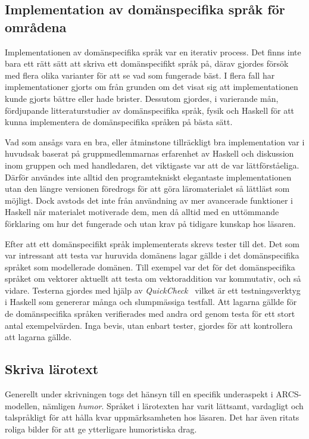 \subsection{Implementation av domänspecifika språk för områdena}

Implementationen av domänspecifika språk var en iterativ process.  Det finns inte bara
ett rätt sätt att skriva ett domänspecifikt språk på, därav gjordes försök med
flera olika varianter för att se vad som fungerade bäst. I flera fall har implementationer gjorts om från grunden om
det visat sig att implementationen kunde gjorts bättre eller
hade brister. Dessutom gjordes, i varierande mån, fördjupande litteraturstudier av domänspecifika
språk, fysik och Haskell för att kunna implementera de domänspecifika språken på bästa sätt.

Vad som ansågs vara en bra, eller åtminstone tillräckligt bra implementation
var i huvudsak baserat på gruppmedlemmarnas erfarenhet av Haskell och diskussion
inom gruppen och med handledaren, det viktigaste var att de var
lättförståeliga. Därför användes inte alltid den programtekniskt elegantaste
implementationen utan den längre versionen föredrogs för att göra
läromaterialet så lättläst som möjligt. Dock avstods det inte från användning av
mer avancerade funktioner i Haskell när materialet motiverade dem, men då alltid
med en uttömmande förklaring om hur det fungerade och utan krav på tidigare
kunskap hos läsaren.

Efter att ett domänspecifikt språk implementerats skrevs tester till det. Det
som var intressant att testa var huruvida domänens lagar gällde i det domänspecifika språket som modellerade domänen. Till exempel var det för det domänspecifika språket om vektorer aktuellt att testa om vektoraddition var kommutativ, och så vidare.
Testerna gjordes med hjälp av \textit{QuickCheck}~\cite{QC} vilket är ett
testningsverktyg i Haskell som genererar många och slumpmässiga testfall. Att
lagarna gällde för de domänspecifika språken verifierades med andra ord genom
testa för ett stort antal exempelvärden. Inga bevis, utan enbart tester, gjordes för att kontrollera att lagarna gällde.

\subsection{Skriva lärotext}

Generellt under skrivningen togs det hänsyn till en specifik underaspekt i
ARCS-modellen, nämligen \textit{humor}. Språket i lärotexten har varit lättsamt,
vardagligt och talspråkligt för att hålla kvar uppmärksamheten hos läsaren. Det
har även ritats roliga bilder för att ge ytterligare humoristiska drag.

